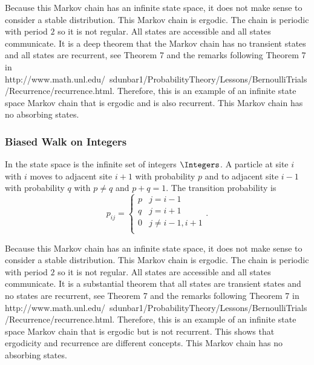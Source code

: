\documentclass[12pt]{article}
\begin{document}
Because this Markov chain has an infinite state space, it does not make
sense to consider a stable distribution.  This Markov chain is ergodic.
The chain is periodic with period \( 2 \) so it is not regular.  All
states are accessible and all states communicate.  It is a deep theorem
that the Markov chain has no transient states and all states are
recurrent, see Theorem 7 and the remarks following Theorem 7 in 
{http://www.math.unl.edu/~sdunbar1/ProbabilityTheory/Lessons/BernoulliTrials/Recurrence/recurrence.html}.
Therefore, this is an example of an infinite state space Markov chain
that is ergodic and is also recurrent.  This Markov chain has no
absorbing states.

\subsubsection*{Biased Walk on Integers}

In  the state space is the%
infinite set of integers \( \Integers \).  A particle at site \( i \)
with \( i \) moves to adjacent site \( i+1 \) with probability \( p \)
and to adjacent site \( i-1 \) with probability \( q \) with \( p \ne q \)
and \( p+q = 1 \).  The transition probability is
\[
    p_{ij} =
    \begin{cases}
        p & j = i-1 \\
        q & j = i+1 \\
        0 & j \ne i-1, i+1 \\
    \end{cases}
    .
\]

Because this Markov chain has an infinite state space, it does not make
sense to consider a stable distribution.  This Markov chain is ergodic.
The chain is periodic with period \( 2 \) so it is not regular.  All
states are accessible and all states communicate.  It is a substantial
theorem that all states are transient states and no states are
recurrent, see Theorem 7 and the remarks following Theorem 7 in 
{http://www.math.unl.edu/~sdunbar1/ProbabilityTheory/Lessons/BernoulliTrials/Recurrence/recurrence.html}.
Therefore, this is an example of an infinite state space Markov chain
that is ergodic but is not recurrent.  This shows that ergodicity and
recurrence are different concepts.  This Markov chain has no absorbing
states.
\end{document}
